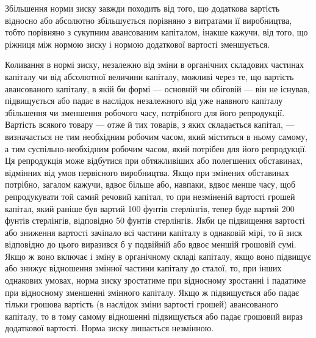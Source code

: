 Збільшення норми зиску завжди походить від того, що додаткова
вартість відносно або абсолютно збільшується порівняно
з витратами її виробництва, тобто порівняно з сукупним авансованим
капіталом, інакше кажучи, від того, що ріжниця між
нормою зиску і нормою додаткової вартості зменшується.

Коливання в нормі зиску, незалежно від зміни в органічних
складових частинах капіталу чи від абсолютної величини капіталу,
можливі через те, що вартість авансованого капіталу,
в якій би формі — основній чи обіговій — він не існував,
підвищується або падає в наслідок незалежного від уже наявного
капіталу збільшення чи зменшення робочого часу, потрібного
для його репродукції. Вартість всякого товару — отже
й тих товарів, з яких складається капітал, — визначається не
тим необхідним робочим часом, який міститься в ньому самому,
а тим суспільно-необхідним робочим часом, який потрібен для
його репродукції. Ця репродукція може відбутися при обтяжливіших
або полегшених обставинах, відмінних від умов первісного
виробництва. Якщо при змінених обставинах потрібно,
загалом кажучи, вдвоє більше або, навпаки, вдвоє менше часу,
щоб репродукувати той самий речовий капітал, то при незміненій
вартості грошей капітал, який раніше був вартий 100 фунтів
стерлінгів, тепер буде вартий 200 фунтів стерлінгів, відповідно
50 фунтів стерлінгів. Якби це підвищення вартості або
зниження вартості зачіпало всі частини капіталу в однаковій
мірі, то й зиск відповідно до цього виразився б у подвійній
або вдвоє меншій грошовій сумі. Якщо ж воно включає і зміну
в органічному складі капіталу, якщо воно підвищує або знижує
відношення змінної частини капіталу до сталої, то, при інших
однакових умовах, норма зиску зростатиме при відносному
зростанні і падатиме при відносному зменшенні змінного капіталу.
Якщо ж підвищується або падає тільки грошова вартість
(в наслідок зміни вартості грошей) авансованого капіталу, то
в тому самому відношенні підвищується або падає грошовий вираз
додаткової вартості. Норма зиску лишається незмінною.
\parbreak{}  %
